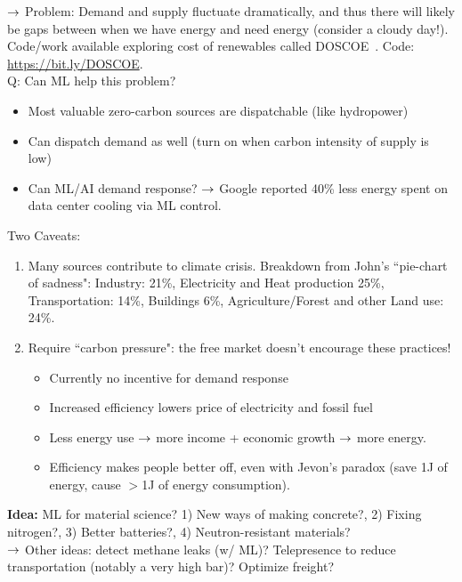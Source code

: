 $\rightarrow$ Problem: Demand and supply fluctuate dramatically, and thus there will likely be gaps between when we have energy and need energy (consider a cloudy day!).\\

Code/work available exploring cost of renewables called DOSCOE~\cite{platt2017analyzing}. Code: \url{https://bit.ly/DOSCOE}. \\

Q: Can ML help this problem?
\begin{itemize}
    \item Most valuable zero-carbon sources are dispatchable (like hydropower)
    \item Can dispatch demand as well (turn on when carbon intensity of supply is low)
    \item Can ML/AI demand response?
    $\rightarrow$ Google  reported 40\% less energy spent on data center cooling via ML control.
\end{itemize}

Two Caveats:
\begin{enumerate}
    \item Many sources contribute to climate crisis. Breakdown from John's ``pie-chart of sadness": Industry: 21\%, Electricity and Heat production 25\%, Transportation: 14\%, Buildings 6\%, Agriculture/Forest and other Land use: 24\%.
    
    \item Require ``carbon pressure": the free market doesn't encourage these practices!
    \begin{itemize}
        \item Currently no incentive for demand response
        \item Increased efficiency lowers price of electricity and fossil fuel
        \item Less energy use $\rightarrow$ more income + economic growth $\rightarrow$ more energy.
        \item Efficiency makes people better off, even with Jevon's paradox (save 1J of energy, cause $>$1J of energy consumption).
    \end{itemize}
\end{enumerate}

{\bf Idea:} ML for material science? 1) New ways of making concrete?, 2) Fixing nitrogen?, 3) Better batteries?, 4) Neutron-resistant materials? \\

$\rightarrow$ Other ideas: detect methane leaks (w/ ML)? Telepresence to reduce transportation (notably a very high bar)? Optimize freight?\\

